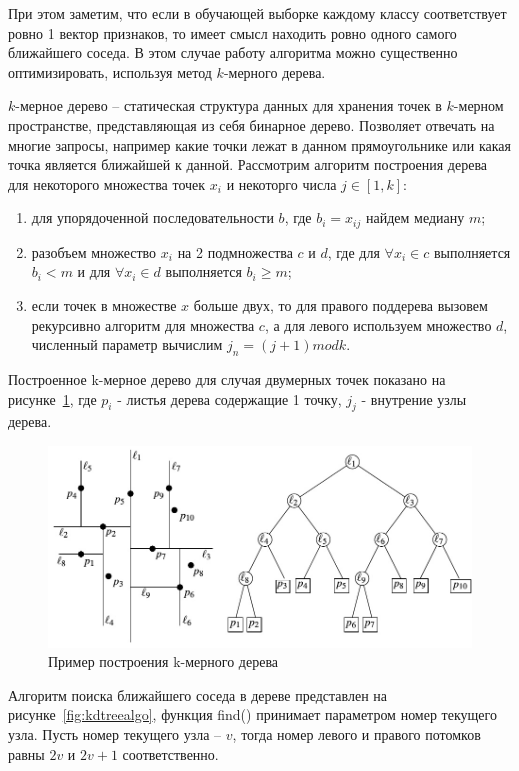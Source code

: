 \documentclass[14pt, a4paper]{extreport}
\begin{document}
	При этом заметим, что если в обучающей выборке каждому классу соответствует ровно 1 вектор признаков, то имеет смысл находить ровно одного самого ближайшего соседа.
	В этом случае работу алгоритма можно существенно оптимизировать, используя метод $k$-мерного дерева.
	
	$k$-мерное дерево -- статическая структура данных для хранения точек в $k$-мерном пространстве, представляющая из себя бинарное дерево. Позволяет отвечать на многие запросы, например какие точки лежат в данном прямоугольнике или какая точка является ближайшей к данной. Рассмотрим алгоритм построения дерева для некоторого множества точек $x_i$ и некоторго числа $j \in [1, k]$:
	\begin{enumerate}[label={\arabic*)}]
		\item для упорядоченной последовательности $b$, где $b_i = x_{ij}$ найдем медиану $m$;
		\item разобъем множество $x_i$ на 2 подмножества $c$ и $d$, где для $\forall x_i \in c$ выполняется $b_i < m$ и для $\forall x_i \in d$ выполняется $b_i \ge m$;
		\item если точек в множестве $x$ больше двух, то для правого поддерева вызовем рекурсивно алгоритм для множества $c$, а для левого используем множество $d$, численный параметр вычислим $j_{n}=(j + 1)mod k$. 
	\end{enumerate}
	 Построенное k-мерное дерево для случая двумерных точек показано на рисунке~\ref{fig:kdtreeexample}, где $p_i$ - листья дерева содержащие 1 точку, $j_j$ - внутрение узлы дерева.
	
	\begin{figure}[h!]
		\centering
		\includegraphics[width = 13cm]{image/chapter_2/kdtreeexample}	
		\caption{Пример построения k-мерного дерева}
		\label{fig:kdtreeexample}
	\end{figure}
	
	Алгоритм поиска ближайшего соседа в дереве представлен на рисунке~\ref{fig:kdtreealgo}, функция find() принимает параметром номер текущего узла. Пусть номер текущего узла -- $v$, тогда номер левого и правого потомков равны $2v$ и $2v+1$ соответственно.
	
\end{document}
